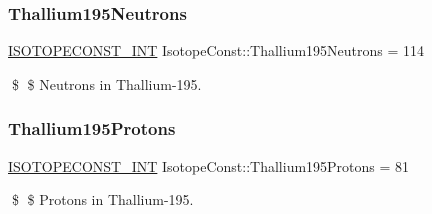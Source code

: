 \subsubsection{\texorpdfstring{Thallium195\+Neutrons}{Thallium195Neutrons}}
{\footnotesize\ttfamily \mbox{\hyperlink{group___isotope_const-_macros_ga5f18360b3e99483a35c32d789e62621c}{I\+S\+O\+T\+O\+P\+E\+C\+O\+N\+S\+T\+\_\+\+I\+NT}} Isotope\+Const\+::\+Thallium195\+Neutrons = 114}

\$ \$ Neutrons in Thallium-\/195. \mbox{\label{group___isotope_const-_thallium-_tl195_ga5ab46bcc936ae91a13b570de5f4093ad}} 
\subsubsection{\texorpdfstring{Thallium195\+Protons}{Thallium195Protons}}
{\footnotesize\ttfamily \mbox{\hyperlink{group___isotope_const-_macros_ga5f18360b3e99483a35c32d789e62621c}{I\+S\+O\+T\+O\+P\+E\+C\+O\+N\+S\+T\+\_\+\+I\+NT}} Isotope\+Const\+::\+Thallium195\+Protons = 81}

\$ \$ Protons in Thallium-\/195. 